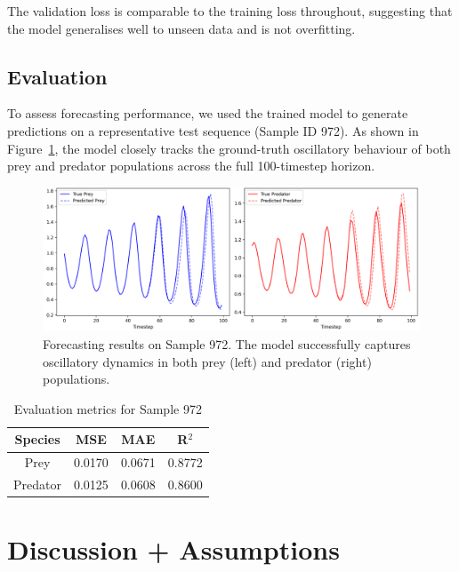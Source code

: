 \documentclass[a4paper,12pt]{article}
\begin{document}
The validation loss is comparable to the training loss throughout, suggesting that the model generalises well to unseen data and is not overfitting.

\subsection*{Evaluation}

To assess forecasting performance, we used the trained model to generate predictions on a representative test sequence (Sample ID 972). As shown in Figure~\ref{fig:sample_prediction}, the model closely tracks the ground-truth oscillatory behaviour of both prey and predator populations across the full 100-timestep horizon.

\begin{figure}[H]
    \centering
    \includegraphics[width=0.95\linewidth]{sample972_trained.png}
    \caption{Forecasting results on Sample 972. The model successfully captures oscillatory dynamics in both prey (left) and predator (right) populations.}
    \label{fig:sample_prediction}
\end{figure}

\begin{table}[H]
    \centering

    \begin{tabular}{|c|c|c|c|}
        \hline
        \textbf{Species} & \textbf{MSE} & \textbf{MAE} & \textbf{R$^2$} \\
        \hline
        Prey & 0.0170 & 0.0671 & 0.8772 \\
        Predator & 0.0125 & 0.0608 & 0.8600 \\
        \hline
    \end{tabular}
    \vspace{0.2cm}
    \caption{Evaluation metrics for Sample 972}
    \label{tab:metrics_sample972}
\end{table}

\section{Discussion + Assumptions}
\end{document}
